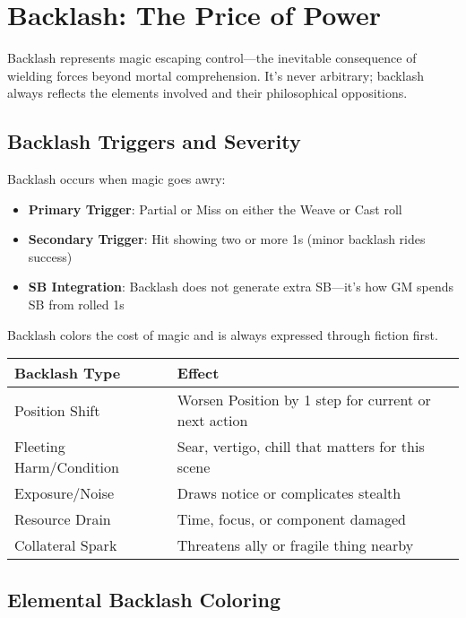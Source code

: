 \section*{Backlash: The Price of Power}

Backlash represents magic escaping control—the inevitable consequence of wielding forces beyond mortal comprehension. It's never arbitrary; backlash always reflects the elements involved and their philosophical oppositions.

\subsection*{Backlash Triggers and Severity}

Backlash occurs when magic goes awry:
\begin{itemize}
    \item \textbf{Primary Trigger}: Partial or Miss on either the Weave or Cast roll
    \item \textbf{Secondary Trigger}: Hit showing two or more 1s (minor backlash rides success)
    \item \textbf{SB Integration}: Backlash does not generate extra SB—it's how GM spends SB from rolled 1s
\end{itemize}

Backlash colors the cost of magic and is always expressed through fiction first.

\begin{fatebox}
\begin{tabularx}{\textwidth}{lX}
\toprule
\textbf{Backlash Type} & \textbf{Effect} \\
\midrule
Position Shift & Worsen Position by 1 step for current or next action \\
Fleeting Harm/Condition & Sear, vertigo, chill that matters for this scene \\
Exposure/Noise & Draws notice or complicates stealth \\
Resource Drain & Time, focus, or component damaged \\
Collateral Spark & Threatens ally or fragile thing nearby \\
\bottomrule
\end{tabularx}
\end{fatebox}

\subsection*{Elemental Backlash Coloring}

